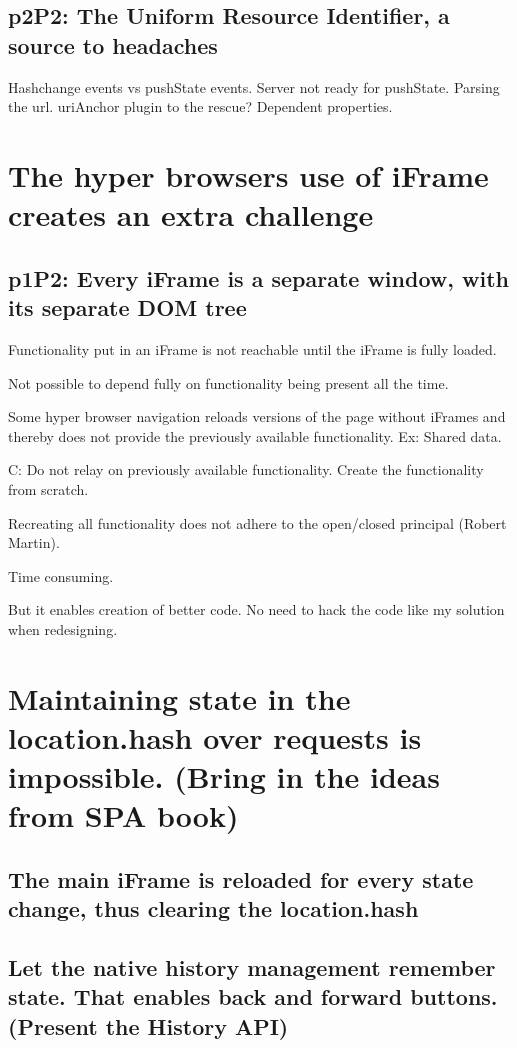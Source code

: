 \documentclass[english]{ifimaster}
\begin{document}
\subsection{p2P2: The Uniform Resource Identifier, a source to headaches}
Hashchange events vs pushState events. Server not ready for pushState. Parsing the url. uriAnchor plugin to the rescue? Dependent properties.

\section{The hyper browsers use of iFrame creates an extra challenge}
\subsection{p1P2: Every iFrame is a separate window, with its separate DOM tree}
Functionality put in an iFrame is not reachable until the iFrame is fully loaded.

Not possible to depend fully on functionality being present all the time.

Some hyper browser navigation reloads versions of the page without iFrames and thereby does not provide the previously available functionality. Ex: Shared data.

C: Do not relay on previously available functionality. Create the functionality from scratch.

Recreating all functionality does not adhere to the open/closed principal (Robert Martin).

Time consuming.

But it enables creation of better code. No need to hack the code like my solution when redesigning.

\section{Maintaining state in the location.hash over requests is impossible. (Bring in the ideas from SPA book)}
\subsection{The main iFrame is reloaded for every state change, thus clearing the location.hash}
\subsection{Let the native history management remember state. That enables back and forward buttons. (Present the History API)}
\end{document}
